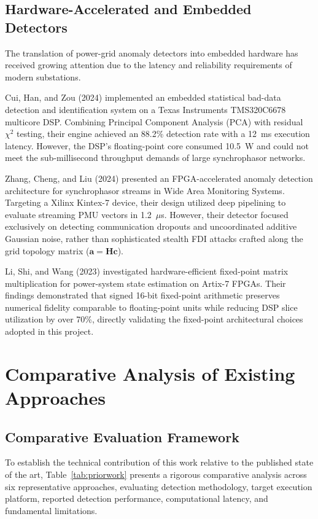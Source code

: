 \documentclass[12pt,a4paper]{report}
\begin{document}
\subsection{Hardware-Accelerated and Embedded Detectors}
The translation of power-grid anomaly detectors into embedded hardware has received growing
attention due to the latency and reliability requirements of modern substations.

Cui, Han, and Zou (2024) \cite{cui2024} implemented an embedded statistical bad-data
detection and identification system on a Texas Instruments TMS320C6678 multicore DSP.
Combining Principal Component Analysis (PCA) with residual $\chi^2$ testing, their engine
achieved an 88.2\% detection rate with a 12~ms execution latency. However, the DSP's
floating-point core consumed 10.5~W and could not meet the sub-millisecond throughput
demands of large synchrophasor networks.

Zhang, Cheng, and Liu (2024) \cite{zhang2024} presented an FPGA-accelerated anomaly detection
architecture for synchrophasor streams in Wide Area Monitoring Systems. Targeting a Xilinx
Kintex-7 device, their design utilized deep pipelining to evaluate streaming PMU vectors
in 1.2~$\mu$s. However, their detector focused exclusively on detecting communication dropouts
and uncoordinated additive Gaussian noise, rather than sophisticated stealth FDI attacks
crafted along the grid topology matrix ($\boldsymbol{a} = \boldsymbol{H}\boldsymbol{c}$).

Li, Shi, and Wang (2023) \cite{li2023} investigated hardware-efficient fixed-point matrix
multiplication for power-system state estimation on Artix-7 FPGAs. Their findings demonstrated
that signed 16-bit fixed-point arithmetic preserves numerical fidelity comparable to
floating-point units while reducing DSP slice utilization by over 70\%, directly validating
the fixed-point architectural choices adopted in this project.

\section{Comparative Analysis of Existing Approaches}

\subsection{Comparative Evaluation Framework}
To establish the technical contribution of this work relative to the published state of
the art, Table~\ref{tab:priorwork} presents a rigorous comparative analysis across six
representative approaches, evaluating detection methodology, target execution platform,
reported detection performance, computational latency, and fundamental limitations.
\end{document}
